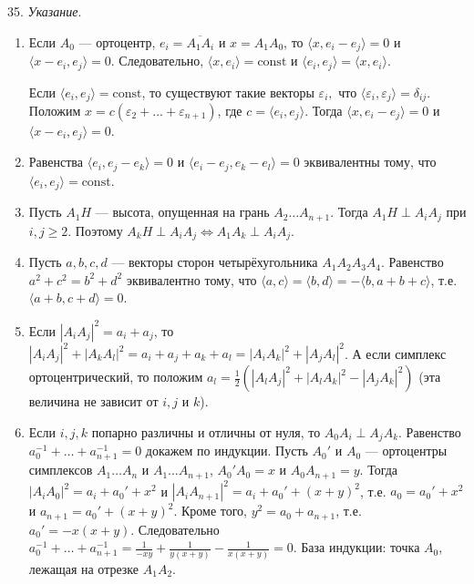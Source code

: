 	35. \textit{Указание}.  
	\begin{enumerate}[label=\asbuk*)]
	\item Если $A_0$ — ортоцентр, $e_i = \overline{A_1 A_i}$ и $x = A_1 A_0$, то $\langle x, e_i - e_j \rangle = 0$ и $\langle x - e_i, e_j \rangle = 0$. Следовательно, $\langle x, e_i \rangle = \text{const}$ и $\langle e_i, e_j \rangle = \langle x, e_i \rangle$.  

	Если $\langle e_i, e_j \rangle = \text{const}$, то существуют такие векторы $\varepsilon_i,$ что $\langle \varepsilon_i, \varepsilon_j \rangle = \delta_{ij}.$ Положим $x = c(\varepsilon_2 + \dots + \varepsilon_{n+1})$, где $c = \langle e_i, e_j \rangle$. Тогда $ \langle x, e_i - e_j \rangle = 0$ и $\langle x - e_i, e_j \rangle = 0$. 

	\item Равенства $\langle e_i, e_j - e_k \rangle = 0$ и $\langle e_i - e_j, e_k - e_l \rangle = 0$ эквивалентны тому, что $\langle e_i, e_j \rangle = \text{const}$. 

	\item Пусть $A_1 H$ — высота, опущенная на грань $A_2 \dots A_{n+1}$. Тогда $A_1 H \perp A_i A_j$ при $i,j \ge 2$. Поэтому $A_k H \perp A_i A_j \Leftrightarrow A_1 A_k \perp A_i A_j$. 

	\item Пусть $a,b,c,d$ — векторы сторон четырёхугольника $A_1 A_2 A_3 A_4$. Равенство $a^2 + c^2 = b^2 + d^2$ эквивалентно тому, что $\langle a,c \rangle = \langle b, d \rangle = - \langle b, a + b + c \rangle$, т.е. $\langle a + b, c + d \rangle = 0$.  

	\item Если $|A_i A_j|^2 = a_i + a_j$, то $|A_i A_j|^2 + |A_k A_l|^2 = a_i + a_j + a_k + a_l = |A_i A_k|^2 + |A_j A_l|^2$. А если симплекс ортоцентрический, то положим $a_l = \frac{1}{2} (|A_l A_j|^2 + |A_l A_k|^2 - |A_j A_k|^2)$ (эта величина не зависит от $i,j$ и $k$). 

	\item Если $i,j,k$ попарно различны и отличны от нуля, то $A_0 A_i \perp A_j A_k$. Равенство $a_0^{-1} + \dots + a_{n+1}^{-1} = 0$ докажем по индукции. Пусть $A_0'$ и $A_0$ — ортоцентры симплексов $A_1 \dots A_n$ и $A_1 \dots A_{n+1}$, $A_0' A_0 = x$ и $A_0 A_{n+1} = y$. Тогда $|A_i A_0|^2 = a_i + a_0' + x^2$ и $|A_i A_{n+1}|^2 = a_i + a_0' + (x+y)^2$, т.е. $a_0 = a_0' + x^2$ и $a_{n+1} = a_0' + (x+y)^2$. Кроме того, $y^2 = a_0 + a_{n+1}$, т.е. $a_0' = -x (x+y)$. Следовательно $a_0^{-1} + \dots + a_{n+1}^{-1} = \frac{1}{-x y} + \frac{1}{y(x+y)} - \frac{1}{x(x+y)} = 0$. База индукции: точка $A_0$, лежащая на отрезке $A_1 A_2$.
	\end{enumerate}

